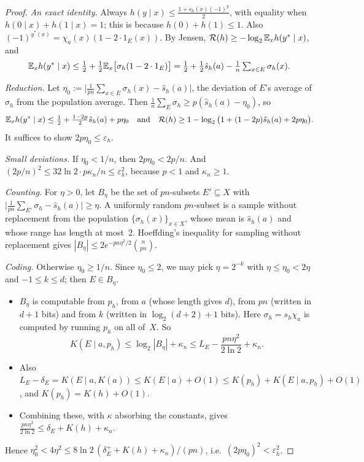 \begin{proof}
\emph{An exact identity.} Always $h(y\mid x)\le\frac{1+s_h(x)(-1)^y}2$, with equality when $h(0\mid x)+h(1\mid x)=1$; this is because $h(0)+h(1)\le1$. Also $(-1)^{y^*(x)}=\chi_a(x)(1-2\cdot1_E(x))$. By Jensen, $\mathcal R(h)\ge-\log_2\mathbb{E}_xh(y^*\mid x)$, and
\[
\mathbb{E}_xh(y^*\mid x)\le\tfrac12+\tfrac12\mathbb{E}_x\big[\sigma_h(1-2\cdot1_E)\big]=\tfrac12+\tfrac12\hat s_h(a)-\tfrac1n\textstyle\sum_{x\in E}\sigma_h(x).
\]

\emph{Reduction.} Let $\eta_0:=\big|\frac1{pn}\sum_{x\in E}\sigma_h(x)-\hat s_h(a)\big|$, the deviation of $E$'s average of $\sigma_h$ from the population average. Then $\frac1n\sum_E\sigma_h\ge p(\hat s_h(a)-\eta_0)$, so
\[
\mathbb{E}_xh(y^*\mid x)\le\tfrac12+\tfrac{1-2p}2\hat s_h(a)+p\eta_0\quad\text{and}\quad\mathcal R(h)\ge1-\log_2\big(1+(1-2p)\hat s_h(a)+2p\eta_0\big).
\]
It suffices to show $2p\eta_0\le\varepsilon_h$.

\emph{Small deviations.} If $\eta_0<1/n$, then $2p\eta_0<2p/n$. And $(2p/n)^2\le32\ln2\cdot p\kappa_n/n\le\varepsilon_h^2$, because $p<1$ and $\kappa_n\ge1$.

\emph{Counting.} For $\eta>0$, let $B_\eta$ be the set of $pn$-subsets $E'\subseteq X$ with $\big|\frac1{pn}\sum_{E'}\sigma_h-\hat s_h(a)\big|\ge\eta$. A uniformly random $pn$-subset is a sample without replacement from the population $\{\sigma_h(x)\}_{x\in X}$, whose mean is $\hat s_h(a)$ and whose range has length at most~2. Hoeffding's inequality for sampling without replacement \citep[\S6]{hoeffding1963probability} gives $|B_\eta|\le2e^{-pn\eta^2/2}\binom n{pn}$.

\emph{Coding.} Otherwise $\eta_0\ge1/n$. Since $\eta_0\le2$, we may pick $\eta=2^{-k}$ with $\eta\le\eta_0<2\eta$ and $-1\le k\le d$; then $E\in B_\eta$.
\begin{itemize}
\item $B_\eta$ is computable from $p_h$, from $a$ (whose length gives $d$), from $pn$ (written in $d+1$ bits) and from $k$ (written in $\log_2(d+2)+1$ bits). Here $\sigma_h=s_h\chi_a$ is computed by running $p_h$ on all of~$X$. So
\[
K(E\mid a,p_h)\le\log_2|B_\eta|+\kappa_n\le L_E-\frac{pn\eta^2}{2\ln2}+\kappa_n.
\]
\item Also $L_E-\delta_E=K(E\mid a,K(a))\le K(E\mid a)+O(1)\le K(p_h)+K(E\mid a,p_h)+O(1)$, and $K(p_h)=K(h)+O(1)$.
\item Combining these, with $\kappa$ absorbing the constants, gives $\frac{pn\eta^2}{2\ln2}\le\delta_E+K(h)+\kappa_n$.
\end{itemize}
Hence $\eta_0^2<4\eta^2\le8\ln2\,(\delta_E^++K(h)+\kappa_n)/(pn)$, i.e.\ $(2p\eta_0)^2<\varepsilon_h^2$.
\end{proof}

